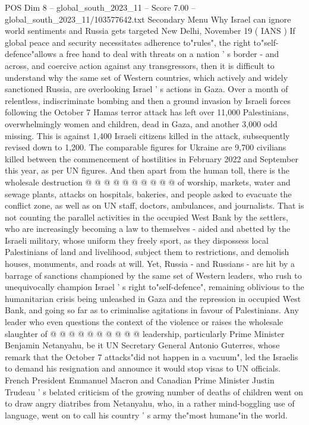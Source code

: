 \begin{textsample}{POS Dim 8 – global\_south\_2023\_11 – Score 7.00 – global\_south\_2023\_11/103577642.txt}  \label{ex:f8_pos_273}
Secondary Menu Why Israel can ignore world sentiments and Russia gets targeted New Delhi, November 19 ( IANS ) If global peace and security necessitates adherence to"rules", the right to"self-defence"allows a free hand to deal with threats on a nation ' s border - and across, and coercive action against any transgressors, then it is difficult to understand why the same set of Western countries, which actively and widely sanctioned Russia, are overlooking Israel ' s actions in Gaza.
Over a month of relentless, indiscriminate bombing and then a ground invasion by Israeli forces following the October 7 Hamas terror attack has left over 11,000 Palestinians, overwhelmingly women and children, dead in Gaza, and another 3,000 odd missing.
This is against 1,400 Israeli citizens killed in the attack, subsequently revised down to 1,200.
The comparable figures for Ukraine are 9,700 civilians killed between the commencement of hostilities in February 2022 and September this year, as per UN figures.
And then apart from the human toll, there is the wholesale destruction @ @ @ @ @ @ @ @ @ @ of worship, markets, water and sewage plants, attacks on hospitals, bakeries, and people asked to evacuate the conflict zone, as well as on UN staff, doctors, ambulances, and journalists.
That is not counting the parallel activities in the occupied West Bank by the settlers, who are increasingly becoming a law to themselves - aided and abetted by the Israeli military, whose uniform they freely sport, as they dispossess local Palestinians of land and livelihood, subject them to restrictions, and demolish houses, monuments, and roads at will.
Yet, Russia - and Russians - are hit by a barrage of sanctions championed by the same set of Western leaders, who rush to unequivocally champion Israel ' s right to"self-defence", remaining oblivious to the humanitarian crisis being unleashed in Gaza and the repression in occupied West Bank, and going so far as to criminalise agitations in favour of Palestinians.
Any leader who even questions the context of the violence or raises the wholesale slaughter of @ @ @ @ @ @ @ @ @ @ leadership, particularly Prime Minister Benjamin Netanyahu, be it UN Secretary General Antonio Guterres, whose remark that the October 7 attacks"did not happen in a vacuum", led the Israelis to demand his resignation and announce it would stop visas to UN officials.
French President Emmanuel Macron and Canadian Prime Minister Justin Trudeau ' s belated criticism of the growing number of deaths of children went on to draw angry diatribes from Netanyahu, who, in a rather mind-boggling use of language, went on to call his country ' s army the"most humane"in the world.

\end{textsample}
